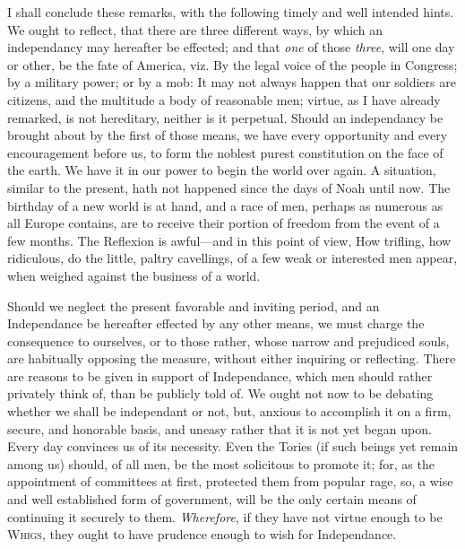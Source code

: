 \documentclass[12pt, twocolumn]{book}
\begin{document}
    I shall conclude these remarks, with the following timely and well intended hints. We ought to reflect, that there are three different ways, by which an independancy may hereafter be effected; and that \textit{one} of those \textit{three}, will one day or other, be the fate of America, viz. By the legal voice of the people in Congress; by a military power; or by a mob: It may not always happen that our soldiers are citizens, and the multitude a body of reasonable men; virtue, as I have already remarked, is not hereditary, neither is it perpetual. Should an independancy be brought about by the first of those means, we have every opportunity and every encouragement before us, to form the noblest purest constitution on the face of the earth. We have it in our power to begin the world over again. A situation, similar to the present, hath not happened since the days of Noah until now. The birthday of a new world is at hand, and a race of men, perhaps as numerous as all Europe contains, are to receive their portion of freedom from the event of a few months. The Reflexion is awful—and in this point of view, How trifling, how ridiculous, do the little, paltry cavellings, of a few weak or interested men appear, when weighed against the business of a world.

    Should we neglect the present favorable and inviting period, and an Independance be hereafter effected by any other means, we must charge the consequence to ourselves, or to those rather, whose narrow and prejudiced souls, are habitually opposing the measure, without either inquiring or reflecting. There are reasons to be given in support of Independance, which men should rather privately think of, than be publicly told of. We ought not now to be debating whether we shall be independant or not, but, anxious to accomplish it on a firm, secure, and honorable basis, and uneasy rather that it is not yet began upon. Every day convinces us of its necessity. Even the Tories (if such beings yet remain among us) should, of all men, be the most solicitous to promote it; for, as the appointment of committees at first, protected them from popular rage, so, a wise and well established form of government, will be the only certain means of continuing it securely to them. \textit{Wherefore}, if they have not virtue enough to be \textsc{Whigs}, they ought to have prudence enough to wish for Independance.
\end{document}
